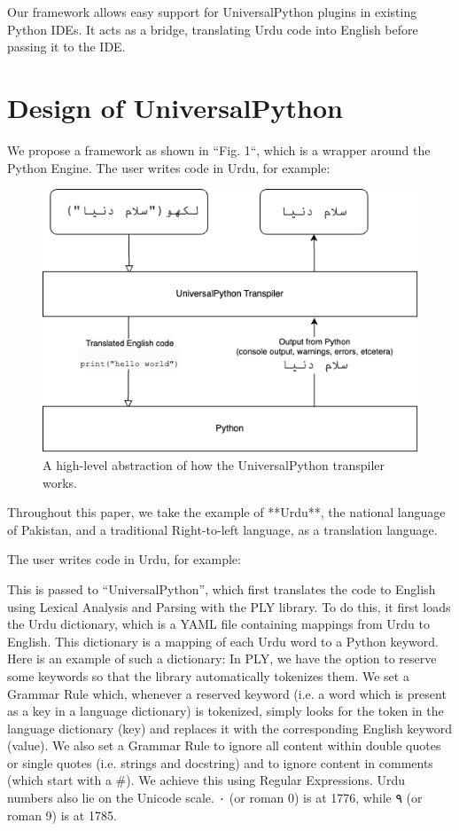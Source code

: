\documentclass[conference]{IEEEtran}
\begin{document}
Our framework allows easy support for UniversalPython plugins in existing Python IDEs. It acts as a bridge, translating Urdu code into English before passing it to the IDE.

\section{Design of UniversalPython}

We propose a framework as shown in “Fig. 1“, which is a wrapper around the Python Engine. The user writes code in Urdu, for example:

\begin{figure}[htbp]
\centerline{\includegraphics[width=\columnwidth]{UniversalPython-flowchart.png}}
\caption{A high-level abstraction of how the UniversalPython transpiler works.}
\label{fig}
\end{figure}

Throughout this paper, we take the example of **Urdu**, the national language of Pakistan, and a traditional Right-to-left language, as a translation language. 

The user writes code in Urdu, for example:




This is passed to “UniversalPython”, which first translates the code to English using Lexical Analysis and Parsing with the PLY library.
To do this, it first loads the Urdu dictionary, which is a YAML file containing mappings from Urdu to English. This dictionary is a mapping of each Urdu word to a Python keyword. Here is an example of such a dictionary:
In PLY, we have the option to reserve some keywords so that the library automatically tokenizes them. We set a Grammar Rule which, whenever a reserved keyword (i.e. a word which is present as a key in a language dictionary) is tokenized, simply looks for the token in the language dictionary (key) and replaces it with the corresponding English keyword (value).
We also set a Grammar Rule to ignore all content within double quotes or single quotes (i.e. strings and docstring) and to ignore content in comments (which start with a \#). We achieve this using Regular Expressions.
Urdu numbers also lie on the Unicode scale. ۰ (or roman 0) is at 1776, while ۹ (or roman 9) is at 1785.
\end{document}
